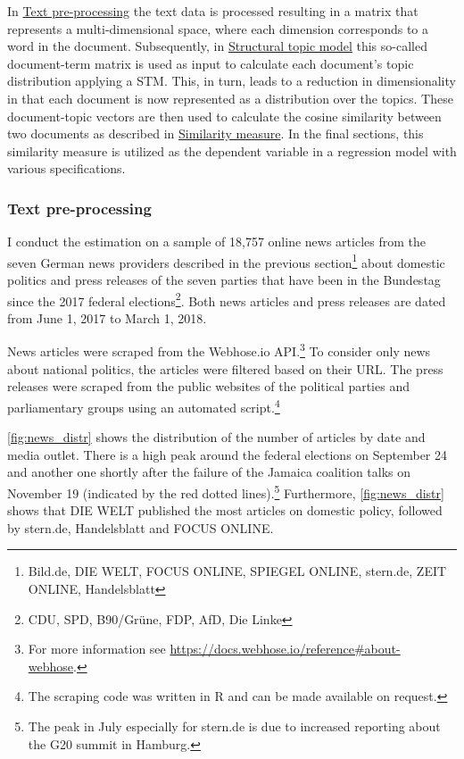 \documentclass[
  12pt,
]{article}
\begin{document}
In \protect\hyperlink{text-pre-processing}{Text pre-processing} the text
data is processed resulting in a matrix that represents a
multi-dimensional space, where each dimension corresponds to a word in
the document. Subsequently, in
\protect\hyperlink{structural-topic-model}{Structural topic model} this
so-called document-term matrix is used as input to calculate each
document's topic distribution applying a STM. This, in turn, leads to a
reduction in dimensionality in that each document is now represented as
a distribution over the topics. These document-topic vectors are then
used to calculate the cosine similarity between two documents as
described in \protect\hyperlink{similarity-measure}{Similarity measure}.
In the final sections, this similarity measure is utilized as the
dependent variable in a regression model with various specifications.

\hypertarget{text-pre-processing}{%
\subsubsection{Text pre-processing}\label{text-pre-processing}}

I conduct the estimation on a sample of 18,757 online news articles from
the seven German news providers described in the previous
section\footnote{Bild.de, DIE WELT, FOCUS ONLINE, SPIEGEL ONLINE,
  stern.de, ZEIT ONLINE, Handelsblatt} about domestic politics and press
releases of the seven parties that have been in the Bundestag since the
2017 federal elections\footnote{CDU, SPD, B90/Grüne, FDP, AfD, Die Linke}.
Both news articles and press releases are dated from June 1, 2017 to
March 1, 2018.

News articles were scraped from the Webhose.io API.\footnote{For more
  information see
  \url{https://docs.webhose.io/reference\#about-webhose}.} To consider
only news about national politics, the articles were filtered based on
their URL. The press releases were scraped from the public websites of
the political parties and parliamentary groups using an automated
script.\footnote{The scraping code was written in R and can be made
  available on request.}

\autoref{fig:news_distr} shows the distribution of the number of
articles by date and media outlet. There is a high peak around the
federal elections on September 24 and another one shortly after the
failure of the Jamaica coalition talks on November 19 (indicated by the
red dotted lines).\footnote{The peak in July especially for stern.de is
  due to increased reporting about the G20 summit in Hamburg.}
Furthermore, \autoref{fig:news_distr} shows that DIE WELT published the
most articles on domestic policy, followed by stern.de, Handelsblatt and
FOCUS ONLINE.
\end{document}
